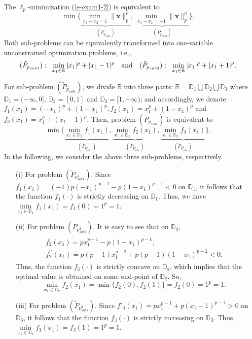 \documentclass[12pt]{article}
\begin{document}
The $\ell_p$-minimization (\ref{e-exam1-2}) is equivalent to
$$
\min\{\underbrace{\min\limits_{x_1-x_2=1}\| \mathbf{x} \|_p^p}\limits_{(P_{p_{sub1}})},\;\underbrace{\min\limits_{x_1-x_2=-1}\| \mathbf{x } \|_p^p}\limits_{(P_{p_{sub2}})}\}.
$$
Both sub-problems can be equivalently transformed into one-variable unconstrained optimization problems, i.e.,
\begin{eqnarray}\label{exam1-subp}
(\tilde{P}_{p_{sub1}}):\;\;\min\limits_{x_1\in\mathbb{R}}|x_1|^p+|x_1-1|^p\quad
\mbox{\rm and}\quad
(\tilde{P}_{p_{sub2}}):\;\;\min\limits_{x_1\in\mathbb{R}}|x_1|^p+|x_1+1|^p.
\end{eqnarray}

For sub-problem $(\tilde{P}_{p_{sub1}})$, we divide $\mathbb{R}$ into three parts: $\mathbb{R}=\mathbb{D}_1\bigcup\mathbb{D}_2\bigcup\mathbb{D}_3$
where $\mathbb{D}_1=(-\infty,0]$, $\mathbb{D}_2=[0,1]$ and $\mathbb{D}_3=[1,+\infty)$; and accordingly, we denote $f_1(x_1)=(-x_1)^p+(1-x_1)^p,f_2(x_1)=x_1^p+(1-x_1)^p$ and $f_3(x_1)=x_1^p+(x_1-1)^p$. Then, problem $(\tilde{P}_{p_{sub1}})$ is equivalent to
$$
\min\{\underbrace{\min\limits_{x_1\in\mathbb{D}_1}f_1(x_1)}\limits_{(\tilde{P}_{p^1_{sub1}})},
\underbrace{\min\limits_{x_1\in\mathbb{D}_2}f_2(x_1)}\limits_{(\tilde{P}_{p^2_{sub1}})},
\underbrace{\min\limits_{x_1\in\mathbb{D}_3}f_3(x_1)}\limits_{(\tilde{P}_{p^3_{sub1}})}\}.
$$
In the following, we consider the above three sub-problems, respectively.
\begin{itemize}
  \item [(i)] For problem $(\tilde{P}_{p^1_{sub1}})$. Since $f^\prime_1(x_1)=(-1)p(-x_1)^{p-1}-p(1-x_1)^{p-1}<0$ on $\mathbb{D}_1$, it follows that the function $f_1(\cdot)$ is strictly decreasing on $\mathbb{D}_1$. Thus, we have
      $\min\limits_{x_1\in\mathbb{D}_1}f_1(x_1)=f_1(0)=1^p=1$.
 \item [(ii)] For problem $(\tilde{P}_{p^2_{sub1}})$. It is easy to see that on $\mathbb{D}_2$,
     \begin{eqnarray*}
     \begin{array}{l}
     f^\prime_2(x_1)=px_1^{p-1}-p(1-x_1)^{p-1},\\ f^{\prime\prime}_2(x_1)=p(p-1)x_1^{p-2}+p(p-1)(1-x_1)^{p-2}<0.
     \end{array}
     \end{eqnarray*}
     Thus, the function $f_2(\cdot)$ is strictly concave on $\mathbb{D}_2$, which implies that  the optimal value is obtained on some end-point of $\mathbb{D}_2$. So,
     $$
     \min\limits_{x_1\in\mathbb{D}_2}f_2(x_1)=\min\{f_2(0),f_2(1)\}=f_2(0)=1^p=1.
     $$
\item [(iii)] For problem $(\tilde{P}_{p^3_{sub1}})$. Since $f'_3(x_1)=px_1^{p-1}+p(x_1-1)^{p-1}>0$
    on $\mathbb{D}_3$, it follows that the function $f_3(\cdot)$ is strictly increasing on $\mathbb{D}_3$. Thus,
      $\min\limits_{x_1\in\mathbb{D}_3}f_3(x_1)=f_3(1)=1^p=1$.
\end{itemize}
\end{document}
